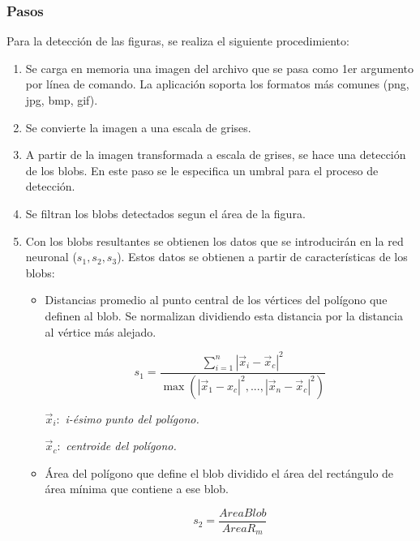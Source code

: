 \documentclass[pdftex,a4paper,12pt]{article}
\begin{document}
\subsubsection{Pasos}
Para la detecci\'on de las figuras, se realiza el siguiente procedimiento:
			\begin{enumerate}
			  	\item	Se carga en memoria una imagen del archivo que se pasa como 1er
			  	argumento por l\'inea de comando. La aplicaci\'on soporta los formatos m\'as
			  	comunes (png, jpg, bmp, gif).
				\item	Se convierte la imagen a una escala de grises.
				\item 	A partir de la imagen transformada a escala de grises, se hace una
				detecci\'on de los blobs. En este paso se le especifica un umbral para el
				proceso de detecci\'on.
				\item	Se filtran los blobs detectados segun el \'area de la figura.
				\item	Con los blobs resultantes se obtienen los datos que se introducir\'an
				en la red neuronal ($ s_{1}, s_{2}, s_{3} $). Estos datos se obtienen a partir de 				           		caracter\'isticas de los blobs:
					\begin{itemize}
                      \item	Distancias promedio al punto central de los v\'ertices
                      del pol\'igono que definen al blob. Se normalizan
                      dividiendo esta distancia por la distancia al v\'ertice m\'as
                      alejado.
                      
  					  \begin{equation} s_{1} = \frac { \sum_{i=1}^{n} { {|\vec {x}_{i} - \vec{x}_{c}|^{2}} } }
				      { \max ( {|\vec{x}_{1} - x_{c}|^{2}}, ... , {|\vec{x}_{n} - \vec{x}_{c}|^{2}} ) }		\end{equation}

					  $ \vec{x}_{i}:  $	 \textit{i-\'esimo punto del pol\'igono. }
					  
					  $ \vec{x}_{c}:  $	 \textit{centroide del pol\'igono. }
						
                      \item	\'Area del pol\'igono que define el blob dividido el 
                      \'area del rect\'angulo de \'area m\'inima que contiene a ese blob.
                      
  					  \begin{equation} s_{2} = \frac { Area Blob }
				                      { Area R_{m}}		\end{equation}


\end{itemize}
\end{enumerate}
\end{document}

